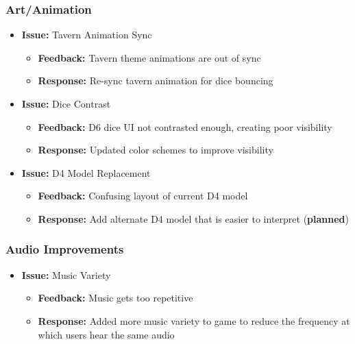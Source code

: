 \documentclass{article}
\begin{document}
\subsubsection{Art/Animation}
\begin{itemize}
    \item \textbf{Issue:} Tavern Animation Sync
    \begin{itemize}
        \item \textbf{Feedback:} Tavern theme animations are out of sync
        \item \textbf{Response:} Re-sync tavern animation for dice bouncing
    \end{itemize}
    
    \item \textbf{Issue:} Dice Contrast
    \begin{itemize}
        \item \textbf{Feedback:} D6 dice UI not contrasted enough, creating poor visibility
        \item \textbf{Response:} Updated color schemes to improve visibility
    \end{itemize}
    
    \item \textbf{Issue:} D4 Model Replacement
    \begin{itemize}
        \item \textbf{Feedback:} Confusing layout of current D4 model
        \item \textbf{Response:} Add alternate D4 model that is easier to interpret (\textbf{planned})
    \end{itemize}
\end{itemize}

\subsubsection{Audio Improvements}
\begin{itemize}
    \item \textbf{Issue:} Music Variety
    \begin{itemize}
        \item \textbf{Feedback:} Music gets too repetitive
        \item \textbf{Response:} Added more music variety to game to reduce the frequency at which users hear the same audio
    \end{itemize}
\end{itemize}
\end{document}
